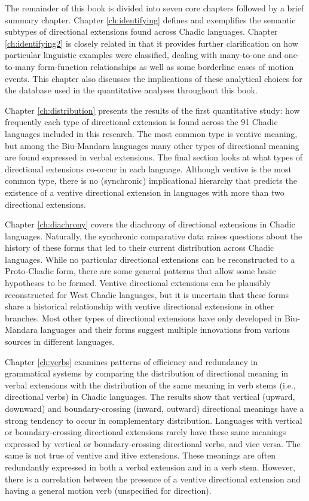 The remainder of this book is divided into seven core chapters followed by a brief summary chapter. Chapter \ref{ch:identifying} defines and exemplifies the semantic subtypes of directional extensions found across Chadic languages. Chapter \ref{ch:identifying2} is closely related in that it provides further clarification on how particular linguistic examples were classified, dealing with many-to-one and one-to-many form-function relationships as well as some borderline cases of motion events. This chapter also discusses the implications of these analytical choices for the database used in the quantitative analyses throughout this book.

Chapter \ref{ch:distribution} presents the results of the first quantitative study: how frequently each type of directional extension is found across the 91 Chadic languages included in this research. The most common type is ventive meaning, but among the Biu-Mandara languages many other types of directional meaning are found expressed in verbal extensions. The final section looks at what types of directional extensions co-occur in each language. Although ventive is the most common type, there is no (synchronic) implicational hierarchy that predicts the existence of a ventive directional extension in languages with more than two directional extensions. 

Chapter \ref{ch:diachrony} covers the diachrony of directional extensions in Chadic languages. Naturally, the synchronic comparative data raises questions about the history of these forms that led to their current distribution across Chadic languages. While no particular directional extensions can be reconstructed to a Proto-Chadic form, there are some general patterns that allow some basic hypotheses to be formed. Ventive directional extensions can be plausibly reconstructed for West Chadic languages, but it is uncertain that these forms share a historical relationship with ventive directional extensions in other branches. Most other types of directional extensions have only developed in Biu-Mandara languages and their forms suggest multiple innovations from various sources in different languages.

Chapter \ref{ch:verbs} examines patterns of efficiency and redundancy in grammatical systems by comparing the distribution of directional meaning in verbal extensions with the distribution of the same meaning in verb stems (i.e., directional verbs) in Chadic languages. The results show that vertical (upward, downward) and boundary-crossing (inward, outward) directional meanings have a strong tendency to occur in complementary distribution. Languages with vertical or boundary-crossing directional extensions rarely have these same meanings expressed by vertical or boundary-crossing directional verbs, and vice versa. The same is not true of ventive and itive extensions. These meanings are often redundantly expressed in both a verbal extension and in a verb stem. However, there is a correlation between the presence of a ventive directional extension and having a general motion verb (unspecified for direction). 

